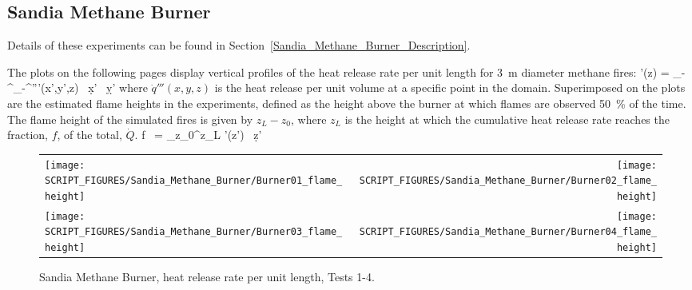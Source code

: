 \clearpage

\subsection{Sandia Methane Burner}
\label{Sandia_Methane_Burner_flame_height}

Details of these experiments can be found in Section~\ref{Sandia_Methane_Burner_Description}.

The plots on the following pages display vertical profiles of the heat release rate per unit length for 3~m diameter methane fires:
\be
   '(z) = \int_{-\infty}^\infty  \int_{-\infty}^\infty {}'''(x',y',z) \, \d x' \, \d y'
\ee
where $\dot{q}'''(x,y,z)$ is the heat release per unit volume at a specific point in the domain. Superimposed on the plots are the estimated flame heights in the experiments, defined as the height above the burner at which flames are observed 50~\% of the time. The flame height of the simulated fires is given by $z_L-z_0$, where $z_L$ is the height at which the cumulative heat release rate reaches the fraction, $f$, of the total, $\dot{Q}$.
\be
   f \,  = \int_{z_0}^{z_L}  '(z') \, \d z'
\ee

\begin{figure}[!h]
\begin{tabular*}{\textwidth}{l@{\extracolsep{\fill}}r}
\texttt{[image: SCRIPT\_FIGURES/Sandia\_Methane\_Burner/Burner01\_flame\_height]} &
\texttt{[image: SCRIPT\_FIGURES/Sandia\_Methane\_Burner/Burner02\_flame\_height]} \\
\texttt{[image: SCRIPT\_FIGURES/Sandia\_Methane\_Burner/Burner03\_flame\_height]} &
\texttt{[image: SCRIPT\_FIGURES/Sandia\_Methane\_Burner/Burner04\_flame\_height]} 
\end{tabular*}
\caption[Sandia Methane Burner, heat release rate per unit length, Tests 1-4]
{Sandia Methane Burner, heat release rate per unit length, Tests 1-4.}
\label{Sandia_Methane_Burner_HRRPUL_1}
\end{figure}

\newpage

